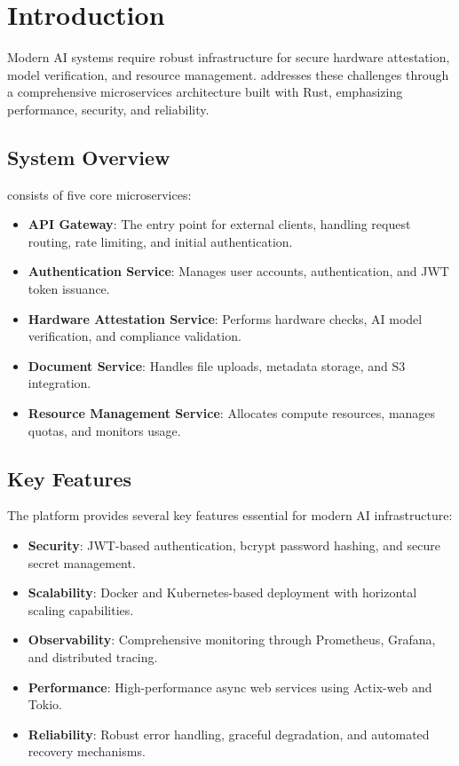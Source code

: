 \section{Introduction}

Modern AI systems require robust infrastructure for secure hardware attestation, model verification, and resource management. \sysname{} addresses these challenges through a comprehensive microservices architecture built with Rust, emphasizing performance, security, and reliability.

\subsection{System Overview}

\sysname{} consists of five core microservices:

\begin{itemize}
    \item \textbf{API Gateway}: The entry point for external clients, handling request routing, rate limiting, and initial authentication.
    \item \textbf{Authentication Service}: Manages user accounts, authentication, and JWT token issuance.
    \item \textbf{Hardware Attestation Service}: Performs hardware checks, AI model verification, and compliance validation.
    \item \textbf{Document Service}: Handles file uploads, metadata storage, and S3 integration.
    \item \textbf{Resource Management Service}: Allocates compute resources, manages quotas, and monitors usage.
\end{itemize}

\subsection{Key Features}

The platform provides several key features essential for modern AI infrastructure:

\begin{itemize}
    \item \textbf{Security}: JWT-based authentication, bcrypt password hashing, and secure secret management.
    \item \textbf{Scalability}: Docker and Kubernetes-based deployment with horizontal scaling capabilities.
    \item \textbf{Observability}: Comprehensive monitoring through Prometheus, Grafana, and distributed tracing.
    \item \textbf{Performance}: High-performance async web services using Actix-web and Tokio.
    \item \textbf{Reliability}: Robust error handling, graceful degradation, and automated recovery mechanisms.
\end{itemize}

